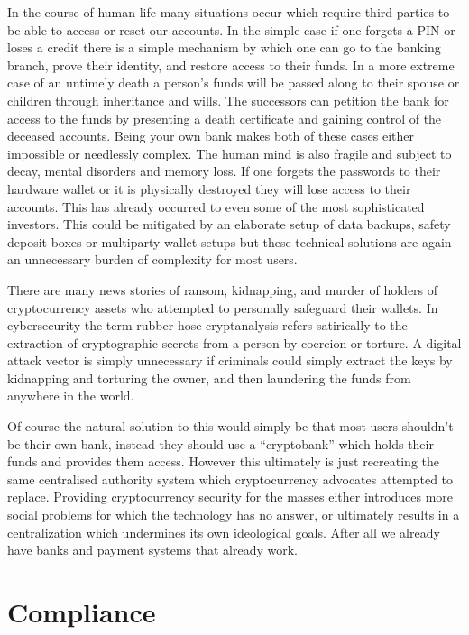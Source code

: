 In the course of human life many situations occur which require third
parties to be able to access or reset our accounts. In the simple case
if one forgets a PIN or loses a credit there is a simple mechanism by
which one can go to the banking branch, prove their identity, and
restore access to their funds. In a more extreme case of an untimely
death a person's funds will be passed along to their spouse or children
through inheritance and wills. The successors can petition the bank for
access to the funds by presenting a death certificate and gaining
control of the deceased accounts. Being your own bank makes both of
these cases either impossible or needlessly complex. The human mind is
also fragile and subject to decay, mental disorders and memory loss. If
one forgets the passwords to their hardware wallet or it is physically
destroyed they will lose access to their accounts. This has already
occurred to even some of the most sophisticated investors. This could be
mitigated by an elaborate setup of data backups, safety deposit boxes or
multiparty wallet setups but these technical solutions are again an
unnecessary burden of complexity for most users.

There are many news stories of ransom, kidnapping, and murder of holders of
cryptocurrency assets who attempted to personally safeguard their wallets. In
cybersecurity the term rubber-hose cryptanalysis refers satirically to the
extraction of cryptographic secrets from a person by coercion or torture. A
digital attack vector is simply unnecessary if criminals could simply extract
the keys by kidnapping and torturing the owner, and then laundering the funds
from anywhere in the world.

Of course the natural solution to this would simply be that most users shouldn't
be their own bank, instead they should use a ``cryptobank'' which holds their
funds and provides them access. However this ultimately is just recreating the
same centralised authority system which cryptocurrency advocates attempted to
replace. Providing cryptocurrency security for the masses either introduces more
social problems for which the technology has no answer, or ultimately results in
a centralization which undermines its own ideological goals. After all we
already have banks and payment systems that already work.

\section{Compliance}

